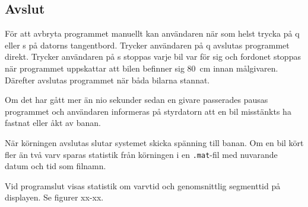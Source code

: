 




\subsection{Avslut}

För att avbryta programmet manuellt kan användaren när som helst trycka på q
eller s på datorns tangentbord. Trycker användaren på q avslutas programmet
direkt. Trycker användaren på s stoppas varje bil var för sig och fordonet
stoppas när programmet uppskattar att bilen befinner sig 80~cm innan målgivaren.
Därefter avslutas programmet när båda bilarna stannat.

Om det har gått mer än nio sekunder sedan en givare passerades pausas programmet
och användaren informeras på styrdatorn att en bil misstänkts ha fastnat eller
åkt av banan. 

När körningen avslutas slutar systemet skicka spänning till banan.
Om en bil kört fler än två varv sparas statistik från körningen i en
\texttt{.mat}-fil med nuvarande datum och tid som filnamn.

Vid programslut visas statistik om varvtid och genomsnittlig segmenttid på
displayen. Se figurer xx-xx.

